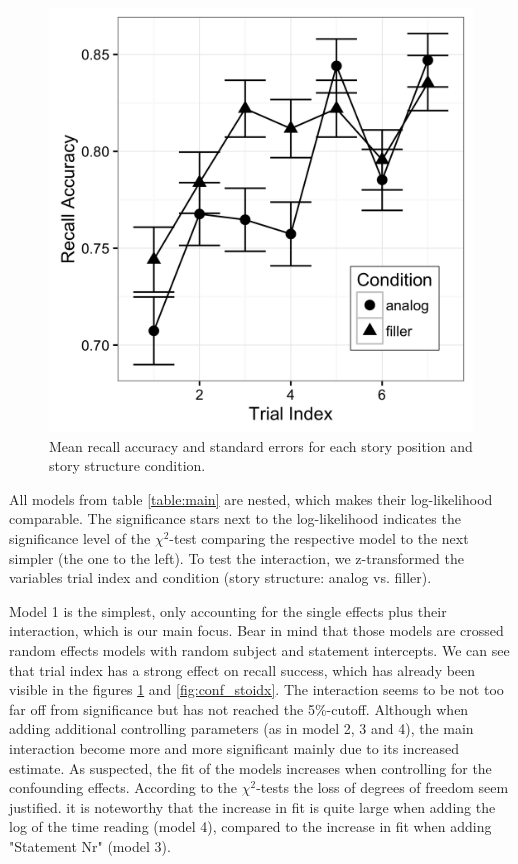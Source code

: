 \documentclass[a4paper,man,natbib,floatsintext,import]{apa6}
\begin{document}
\begin{figure}
\centering
\begin{minipage}[t]{.5\textwidth}
\includegraphics[width=.9\linewidth]{figures/main.png}
\caption{Mean recall accuracy and standard errors for each story position and story structure condition.}
\label{fig:main}
\end{minipage}
\end{figure}

All models from table \ref{table:main} are nested, which makes their log-likelihood comparable. The significance stars next to the log-likelihood indicates the significance level of the ${\chi}^2$-test comparing the respective model to the next simpler (the one to the left). To test the interaction, we z-transformed the variables trial index and condition (story structure: analog vs. filler).

Model 1 is the simplest, only accounting for the single effects plus their interaction, which is our main focus. Bear in mind that those models are crossed random effects models with random subject and statement intercepts. We can see that trial index has a strong effect on recall success, which has already been visible in the figures \ref{fig:main} and \ref{fig:conf_stoidx}. The interaction seems to be not too far off from significance but has not reached the 5\%-cutoff. Although when adding additional controlling parameters (as in model 2, 3 and 4), the main interaction become more and more significant mainly due to its increased estimate. As suspected, the fit of the models increases when controlling for the confounding effects. According to the ${\chi}^2$-tests the loss of degrees of freedom seem justified. it is noteworthy that the increase in fit is quite large when adding the log of the time reading (model 4), compared to the increase in fit when adding "Statement Nr" (model 3).
\end{document}
